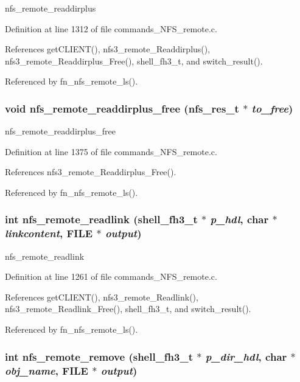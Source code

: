 nfs\_\-remote\_\-readdirplus 

Definition at line 1312 of file commands\_\-NFS\_\-remote.c.

References get\-CLIENT(), nfs3\_\-remote\_\-Readdirplus(), nfs3\_\-remote\_\-Readdirplus\_\-Free(), shell\_\-fh3\_\-t, and switch\_\-result().

Referenced by fn\_\-nfs\_\-remote\_\-ls().
\subsubsection{\setlength{\rightskip}{0pt plus 5cm}void nfs\_\-remote\_\-readdirplus\_\-free (nfs\_\-res\_\-t $\ast$ {\em to\_\-free})}\label{commands__NFS__remote_8c_a45}


nfs\_\-remote\_\-readdirplus\_\-free 

Definition at line 1375 of file commands\_\-NFS\_\-remote.c.

References nfs3\_\-remote\_\-Readdirplus\_\-Free().

Referenced by fn\_\-nfs\_\-remote\_\-ls().
\subsubsection{\setlength{\rightskip}{0pt plus 5cm}int nfs\_\-remote\_\-readlink ({\bf shell\_\-fh3\_\-t} $\ast$ {\em p\_\-hdl}, char $\ast$ {\em linkcontent}, FILE $\ast$ {\em output})}\label{commands__NFS__remote_8c_a43}


nfs\_\-remote\_\-readlink 

Definition at line 1261 of file commands\_\-NFS\_\-remote.c.

References get\-CLIENT(), nfs3\_\-remote\_\-Readlink(), nfs3\_\-remote\_\-Readlink\_\-Free(), shell\_\-fh3\_\-t, and switch\_\-result().

Referenced by fn\_\-nfs\_\-remote\_\-ls().
\subsubsection{\setlength{\rightskip}{0pt plus 5cm}int nfs\_\-remote\_\-remove ({\bf shell\_\-fh3\_\-t} $\ast$ {\em p\_\-dir\_\-hdl}, char $\ast$ {\em obj\_\-name}, FILE $\ast$ {\em output})}\label{commands__NFS__remote_8c_a51}


